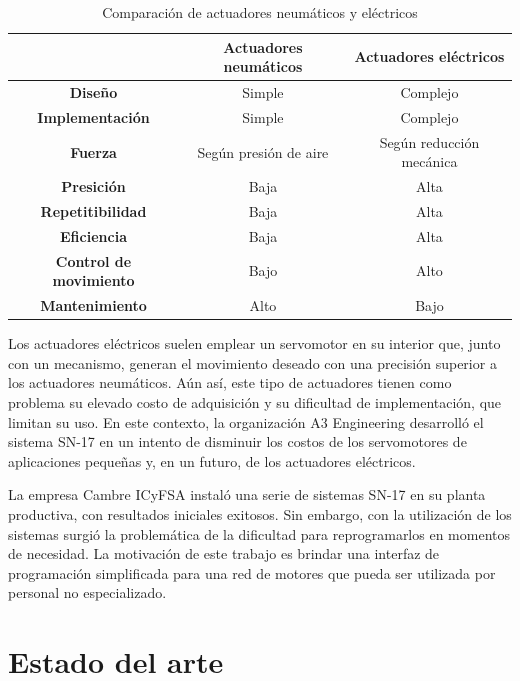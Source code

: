 \begin{table}[htpb]
	\centering
	\caption[Comparación de actuadores neumáticos y eléctricos]{Comparación de actuadores neumáticos y eléctricos}
	\begin{tabular}{c | c | c}    
		\toprule
		 	 & \textbf{Actuadores neumáticos}  & \textbf{Actuadores eléctricos}\\
		\midrule
		\textbf{Diseño} 			& Simple 		& Complejo \\
		\textbf{Implementación} 	& Simple 		& Complejo \\				
		\textbf{Fuerza} 			& Según presión de aire	& Según reducción mecánica \\
		\textbf{Presición}			& Baja 	& Alta \\
		\textbf{Repetitibilidad}	& Baja 	& Alta \\
		\textbf{Eficiencia}			& Baja 	& Alta \\
		\textbf{Control de movimiento}	& Bajo 	& Alto \\
		\textbf{Mantenimiento}	& Alto 	& Bajo \\
		\bottomrule
		\hline
	\end{tabular}
	\label{tab:comparacion_neumatico_electrico}
\end{table}

Los actuadores eléctricos suelen emplear un servomotor en su interior que, junto con un mecanismo, generan el movimiento deseado con una precisión superior a los actuadores neumáticos. Aún así, este tipo de actuadores tienen como problema su elevado costo de adquisición y su dificultad de implementación, que limitan su uso. En este contexto, la organización A3 Engineering desarrolló el sistema SN-17 en un intento de disminuir los costos de los servomotores de aplicaciones pequeñas y, en un futuro, de los actuadores eléctricos.

La empresa Cambre ICyFSA instaló una serie de sistemas SN-17 en su planta productiva, con resultados iniciales exitosos. Sin embargo, con la utilización de los sistemas surgió la problemática de la dificultad para reprogramarlos en momentos de necesidad. La motivación de este trabajo es brindar una interfaz de programación simplificada para una red de motores que pueda ser utilizada por personal no especializado.



\section{Estado del arte}

